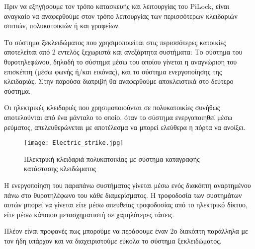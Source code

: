 Πριν να εξηγήσουμε τον τρόπο κατασκευής και λειτουργίας του PiLock, είναι αναγκαίο να αναφερθούμε στον τρόπο λειτουργίας των περισσότερων κλειδαριών σπιτιών, πολυκατοικιών ή και γραφείων.

Το σύστημα ξεκλειδώματος που χρησιμοποιείται στις περισσότερες κατοικίες αποτελείται από 2 εντελός ξεχωριστά και ανεξάρτητα συστήματα: Το σύστημα του θυροτηλεφώνου, δηλαδή το σύστημα μέσω του οποίου γίνεται η αναγνώριση του επισκέπτη (μέσω φωνής ή/και εικόνας), και το σύστημα ενεργοποίησης της κλειδαριάς. Στην παρούσα διατριβή θα αναφερθούμε αποκλειστικά στο δεύτερο σύστημα.

Οι ηλεκτρικές κλειδαριές που χρησιμοποιούνται σε πολυκατοικίες συνήθως αποτελούνται από ένα μάνταλο το οποίο, όταν το σύστημα ενεργοποιηθεί μέσω ρεύματος, απελευθερώνεται με αποτέλεσμα να μπορεί ελεύθερα η πόρτα να ανοίξει.

\begin{figure}[h]
	\centering
		\texttt{[image: Electric\_strike.jpg]}
	\caption{Ηλεκτρική κλειδαριά πολυκατοικίας με σύστημα καταγραφής κατάστασης κλειδώματος}
\end{figure}

Η ενεργοποίηση του παραπάνω συστήματος γίνεται μέσω ενός διακόπτη αναρτημένου πάνω στο θυροτηλέφωνο του κάθε διαμερίσματος. Η τροφοδοσία των συστημάτων αυτών μπορεί να γίνεται είτε μέσω απευθείας τροφοδοσίας από το ηλεκτρικό δίκτυο, είτε μέσω κάποιου μετασχηματιστή σε χαμηλότερες τάσεις.

Πλέον είναι προφανές πως μπορούμε να περάσουμε έναν 2ο διακόπτη παράλληλα με τον ήδη υπάρχον και να διαχειριστούμε εύκολα το σύστημα ξεκλειδώματος.